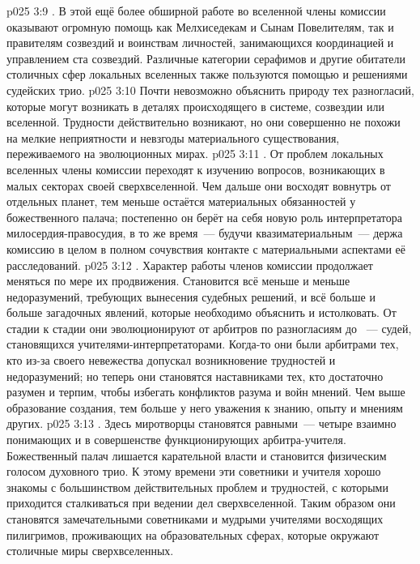 \vs p025 3:9 . В этой ещё более обширной работе во вселенной члены комиссии оказывают огромную помощь как Мелхиседекам и Сынам Повелителям, так и правителям созвездий и воинствам личностей, занимающихся координацией и управлением ста созвездий. Различные категории серафимов и другие обитатели столичных сфер локальных вселенных также пользуются помощью и решениями судейских трио.
\vs p025 3:10 Почти невозможно объяснить природу тех разногласий, которые могут возникать в деталях происходящего в системе, созвездии или вселенной. Трудности действительно возникают, но они совершенно не похожи на мелкие неприятности и невзгоды материального существования, переживаемого на эволюционных мирах.
\vs p025 3:11 . От проблем локальных вселенных члены комиссии переходят к изучению вопросов, возникающих в малых секторах своей сверхвселенной. Чем дальше они восходят вовнутрь от отдельных планет, тем меньше остаётся материальных обязанностей у божественного палача; постепенно он берёт на себя новую роль интерпретатора милосердия\hyp{}правосудия, в то же время~--- будучи квазиматериальным~--- держа комиссию в целом в полном сочувствия контакте с материальными аспектами её расследований.
\vs p025 3:12 . Характер работы членов комиссии продолжает меняться по мере их продвижения. Становится всё меньше и меньше недоразумений, требующих вынесения судебных решений, и всё больше и больше загадочных явлений, которые необходимо объяснить и истолковать. От стадии к стадии они эволюционируют от арбитров по разногласиям до ~--- судей, становящихся учителями\hyp{}интерпретаторами. Когда\hyp{}то они были арбитрами тех, кто из\hyp{}за своего невежества допускал возникновение трудностей и недоразумений; но теперь они становятся наставниками тех, кто достаточно разумен и терпим, чтобы избегать конфликтов разума и войн мнений. Чем выше образование создания, тем больше у него уважения к знанию, опыту и мнениям других.
\vs p025 3:13 . Здесь миротворцы становятся равными~--- четыре взаимно понимающих и в совершенстве функционирующих арбитра\hyp{}учителя. Божественный палач лишается карательной власти и становится физическим голосом духовного трио. К этому времени эти советники и учителя хорошо знакомы с большинством действительных проблем и трудностей, с которыми приходится сталкиваться при ведении дел сверхвселенной. Таким образом они становятся замечательными советниками и мудрыми учителями восходящих пилигримов, проживающих на образовательных сферах, которые окружают столичные миры сверхвселенных.

